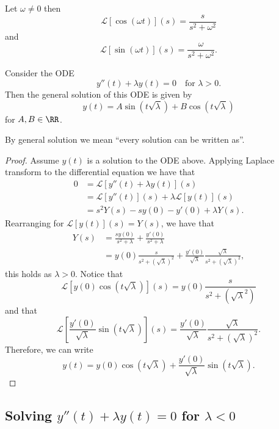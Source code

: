 \documentclass[12pt, a4paper]{article}
\newcommand{\CL}{\mathcal{L}}
\begin{document}
\begin{mdprop}
    Let \(\omega \neq 0\) then
    \[\CL\left[ \cos(\omega t) \right](s) = \frac{s}{s^2+\omega^2}\]
    and
    \[\CL\left[ \sin(\omega t) \right](s) = \frac{\omega}{s^2+\omega^2}.\]
\end{mdprop}

\begin{mdprop}
    Consider the ODE
    \[y''(t) + \lambda y(t)=0 \quad \text{for } \lambda>0.\]
    Then the general solution of this ODE is given by 
    \[y(t) = A \sin\left( t\sqrt{\lambda} \right) + B \cos\left( t\sqrt{\lambda} \right)\]
    for \(A,B \in \RR\).
\end{mdprop}

\begin{mdremark}
    By general solution we mean ``every solution can be written as''.
\end{mdremark}

\begin{proof}
    Assume \(y(t)\) is a solution to the ODE above. Applying Laplace transform to the differential equation we have that 
    \[\begin{aligned}
        0 &= \CL\left[ y''(t)+\lambda y(t) \right](s) \\
        &= \CL[y''(t)](s) +\lambda \CL[y(t)](s) \\
        &= s^2 Y(s)- sy(0)-y'(0) + \lambda Y(s).
    \end{aligned}\]
    Rearranging for \(\CL[y(t)](s) = Y(s)\), we have that 
    \[\begin{aligned}
        Y(s) &= \frac{s y(0)}{s^2+\lambda} + \frac{y'(0)}{s^2+\lambda} \\
        &= y(0) \frac{s}{s^2+\left( \sqrt{\lambda} \right)^2} + \frac{y'(0)}{\sqrt{\lambda}} \frac{\sqrt{\lambda}}{s^2+\left( \sqrt{\lambda} \right)^2},
    \end{aligned}\]
    this holds as \(\lambda>0\). Notice that 
    \[\CL\left[ y(0)\cos\left( t\sqrt{\lambda} \right) \right](s) = y(0)\frac{s}{s^2+\left( \sqrt{\lambda}^2 \right)}\]
    and that 
    \[\CL\left[ \frac{y'(0)}{\sqrt{\lambda}} \sin\left( t\sqrt{\lambda} \right) \right](s) =\frac{y'(0)}{\sqrt{\lambda}} \frac{\sqrt{\lambda}}{s^2+\left( \sqrt{\lambda} \right)^2}.\]
    Therefore, we can write 
    \[y(t) = y(0) \cos\left( t\sqrt{\lambda} \right)+\frac{y'(0)}{\sqrt{\lambda}}\sin\left( t\sqrt{\lambda} \right).\]
\end{proof}

\subsection{Solving \texorpdfstring{\(y''(t)+\lambda y(t)=0\)}{TEXT} for \texorpdfstring{\(\lambda<0\)}{TEXT}}
\end{document}
